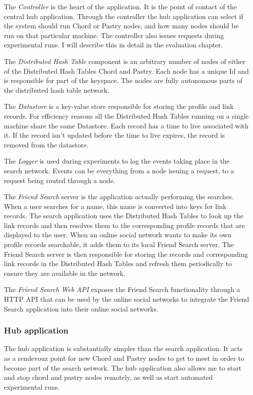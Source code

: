 The \emph{Controller} is the heart of the application. It is the point of contact of the central hub application. Through the controller the hub application can select if the system should run Chord or Pastry nodes, and how many nodes should be run on that particular machine. The controller also issues requests during experimental runs. I will describe this in detail in the evaluation chapter.

The \emph{Distributed Hash Table} component is an arbitrary number of nodes of either of the Distributed Hash Tables Chord and Pastry. Each node has a unique Id and is responsible for part of the keyspace. The nodes are fully autonomous parts of the distributed hash table network.

The \emph{Datastore} is a key-value store responsible for storing the profile and link records. For efficiency reasons all the Distributed Hash Tables running on a single machine share the same Datastore. Each record has a time to live associated with it. If the record isn't updated before the time to live expires, the record is removed from the datastore.

The \emph{Logger} is used during experiments to log the events taking place in the search network. Events can be everything from a node issuing a request, to a request being routed through a node.

The \emph{Friend Search} server is the application actually performing the searches. When a user searches for a name, this name is converted into keys for link records. The search application uses the Distributed Hash Tables to look up the link records and then resolves them to the corresponding profile records that are displayed to the user.
When an online social network wants to make its own profile records searchable, it adds them to its local Friend Search server. The Friend Search server is then responsible for storing the records and corresponding link records in the Distributed Hash Tables and refresh them periodically to ensure they are available in the network.

The \emph{Friend Search Web API} exposes the Friend Search functionality through a HTTP API that can be used by the online social networks to integrate the Friend Search application into their online social networks.

\subsubsection{Hub application}
The hub application is substantially simpler than the search application. It acts as a rendevouz point for new Chord and Pastry nodes to get to meet in order to become part of the search network. The hub application also allows me to start and stop chord and pastry nodes remotely, as well as start automated experimental runs.

